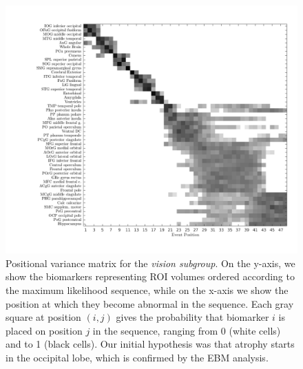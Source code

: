 \begin{figure}[H]
 \centering
 \includegraphics[scale=0.4, trim=100 50 0 0]{images/ebm/mriAllGaussUnifDirEAR/posVarianceMatrix.png}
 \caption{Positional variance matrix for the \emph{vision subgroup}. On the y-axis, we show the biomarkers representing ROI volumes ordered according to the maximum likelihood sequence, while on the x-axis we show the position at which they become abnormal in the sequence. Each gray square at position $(i,j)$ gives the probability that biomarker $i$ is placed on position $j$ in the sequence, ranging from 0 (white cells) and to 1 (black cells). Our initial hypothesis was that atrophy starts in the occipital lobe, which is confirmed by the EBM analysis.}
   \label{fig:EAR}
\end{figure}

\newcommand*{\snapLocationEAR}{images/ebm/mriAllGaussUnifDirEAR/snapshots}
\newcommand*{\captionSnapEBMEAR}{\caption{(a) Timing of atrophy for the \emph{vision} subgroup. White regions have not been affected, while red regions have been affected by the corresponding stage.}\label{fig:SnapEBMEAR}}




